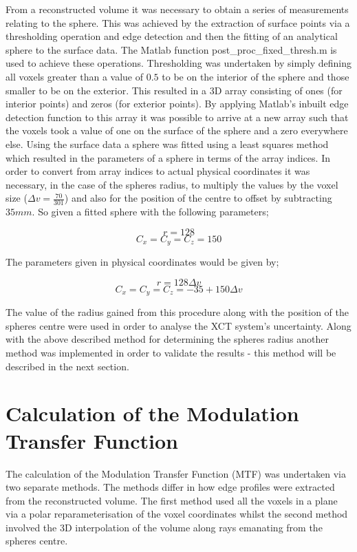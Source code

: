 \documentclass[
  twoside,
  11pt, a4paper,
  footinclude=true,
  headinclude=true,
  cleardoublepage=empty
]{scrbook}
\begin{document}
From a reconstructed volume it was necessary to obtain a series of measurements relating to the sphere. This was achieved by the extraction of surface points via a thresholding operation and edge detection and then the fitting of an analytical sphere to the surface data. The Matlab function post\_proc\_fixed\_thresh.m is used to achieve these operations. Thresholding was undertaken by simply defining all voxels greater than a value of $0.5$ to be on the interior of the sphere and those smaller to be on the exterior. This resulted in a 3D array consisting of ones (for interior points) and zeros (for exterior points). By applying Matlab's inbuilt edge detection function to this array it was possible to arrive at a new array such that the voxels took a value of one on the surface of the sphere and a zero everywhere else. Using the surface data a sphere was fitted using a least squares method which resulted in the parameters of a sphere in terms of the array indices. In order to convert from array indices to actual physical coordinates it was necessary, in the case of the spheres radius, to multiply the values by the voxel size ($\Delta v = \frac{70}{301}$) and also for the position of the centre to offset by subtracting $35mm$. So given a fitted sphere with the following parameters;

\[
r = 128
\]
\[
C_x = C_y = C_z = 150
\]

The parameters given in physical coordinates would be given by;

\[
r = 128\Delta v
\]
\[
C_x = C_y = C_z = -35 + 150\Delta v
\]

The value of the radius gained from this procedure along with the position of the spheres centre were used in order to analyse the XCT system's uncertainty. Along with the above described method for determining the spheres radius another method was implemented in order to validate the results - this method will be described in the next section.

\section{Calculation of the Modulation Transfer Function}

The calculation of the Modulation Transfer Function (MTF) was undertaken via two separate methods. The methods differ in how edge profiles were extracted from the reconstructed volume. The first method used all the voxels in a plane via a polar reparameterisation of the voxel coordinates whilst the second method involved the 3D interpolation of the volume along rays emanating from the spheres centre.
\end{document}
